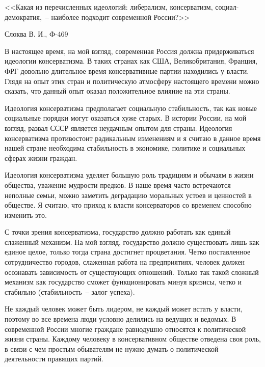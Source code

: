 \documentclass[pscyr]{hedreport}
\begin{document}
  \onehalfspacing
  \begin{center}
    <<Какая из перечисленных идеологий: либерализм, консерватизм,
      социал-демократия,~-- наиболее подходит современной России?>>
  \end{center}  
  \vspace{-2em}
  \begin{flushright}
    Слоква В. И., Ф-469
  \end{flushright}

  В настоящее время, на мой взгляд, современная Россия должна придерживаться
  идеологии консерватизма. В таких странах как США, Великобритания, Франция,
  ФРГ довольно длительное время консервативные партии находились у власти.
  Глядя на опыт этих стран и политическую атмосферу настоящего времени можно
  сказать, что данный опыт оказал положительное влияние на эти страны.

  Идеология консерватизма предполагает социальную стабильность, так как новые
  социальные порядки могут оказаться хуже старых. В истории России, на мой
  взгляд, развал СССР является неудачным опытом для страны. Идеология
  консерватизма противостоит радикальным изменениям и я считаю в данное время
  нашей стране необходима стабильность в экономике, политике и социальных сферах
  жизни граждан.

  Идеология консерватизма уделяет большую роль традициям и обычаям в жизни
  общества, уважение мудрости предков. В наше время часто встречаются неполные
  семьи, можно заметить деградацию моральных устоев и ценностей в обществе. Я
  считаю, что приход к власти консерваторов со временем способно изменить это.

  С точки зрения консерватизма, государство должно работать как единый слаженный
  механизм. На мой взгляд, государство должно существовать лишь как единое
  целое, только тогда страна достигнет процветания. Четко поставленное
  сотрудничество городов, слаженная работа на предприятиях, человек должен
  осознавать зависимость от существующих отношений. Только так такой сложный
  механизм как государство сможет функционировать минуя кризисы, четко и
  стабильно (стабильность~-- залог успеха).

  Не каждый человек может быть лидером, не каждый может встать у власти, поэтому
  во все времена люди условно делились на ведущих и ведомых. В современной
  России многие граждане равнодушно относятся к политической жизни страны.
  Каждому человеку в консервативном обществе отведена своя роль, в связи с чем
  простым обывателям не нужно думать о политической деятельности правящих
  партий.
\end{document}
